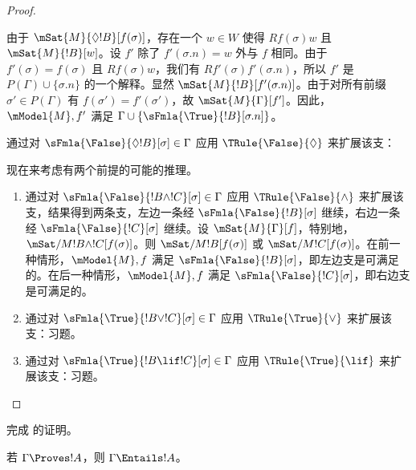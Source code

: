 \documentclass[../../../include/open-logic-section]{subfiles}
\begin{document}
\begin{proof}
\begin{enumerate}
{{  由于 $\mSat{M}{\Diamond !B}[f(\sigma)]$，存在一个 $w \in W$ 使得 $Rf(\sigma)w$ 且 $\mSat{M}{!B}[w]$。设 $f'$ 除了 $f'(\sigma.n) = w$ 外与 $f$ 相同。由于 $f'(\sigma) = f(\sigma)$ 且 $Rf(\sigma)w$，我们有 $Rf'(\sigma)f'(\sigma.n)$，所以 $f'$ 是 $P(\Gamma) \cup \{\sigma.n\}$ 的一个解释。显然 $\mSat{M}{!B}[f'(\sigma.n)]$。由于对所有前缀 $\sigma' \in P(\Gamma)$ 有 $f(\sigma') = f'(\sigma')$，故 $\mSat{M}{\Gamma}[f']$。因此，$\mModel{M}, f'$ 满足 $\Gamma \cup \{\sFmla{\True}{!B}[\sigma.n]\}$。}
\item 通过对 $\sFmla{\False}{\Diamond !B}[\sigma] \in \Gamma$ 应用 $\TRule{\False}{\Diamond}$ 来扩展该支：
  }{}
\end{enumerate}
现在来考虑有两个前提的可能的推理。
\begin{enumerate}
\item 通过对 $\sFmla{\False}{!B \land !C}[\sigma] \in \Gamma$ 应用 $\TRule{\False}{\land}$ 来扩展该支，结果得到两条支，左边一条经 $\sFmla{\False}{!B}[\sigma]$ 继续，右边一条经 $\sFmla{\False}{!C}[\sigma]$ 继续。设 $\mSat{M}{\Gamma}[f]$，特别地，$\mSat/{M}{!B \land !C}[f(\sigma)]$。则 $\mSat/{M}{!B}[f(\sigma)]$ 或 $\mSat/{M}{!C}[f(\sigma)]$。在前一种情形，$\mModel{M}, f$ 满足 $\sFmla{\False}{!B}[\sigma]$，即左边支是可满足的。在后一种情形，$\mModel{M}, f$ 满足 $\sFmla{\False}{!C}[\sigma]$，即右边支是可满足的。
\item 通过对 $\sFmla{\True}{!B \lor !C}[\sigma] \in \Gamma$ 应用 $\TRule{\True}{\lor}$ 来扩展该支：习题。
\item 通过对 $\sFmla{\True}{!B \lif !C}[\sigma] \in \Gamma$ 应用 $\TRule{\True}{\lif}$ 来扩展该支：习题。
\end{enumerate}
\end{proof}

\begin{prob}
完成  的证明。
\end{prob}

\begin{cor}
若 $\Gamma \Proves !A$，则 $\Gamma \Entails !A$。
\end{cor}
\end{document}
